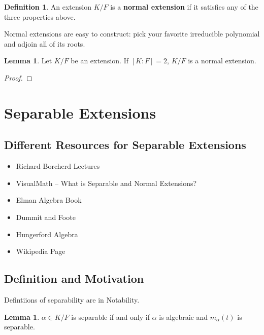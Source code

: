 \documentclass{article}
\theoremstyle{definition}
\newtheorem{definition}{Definition}
\newtheorem{lemma}[theorem]{Lemma}
\begin{document}
\begin{definition}
    An extension $K/F$ is a \textbf{normal extension} if it satisfies any of the three
    properties above.
\end{definition}

Normal extensions are easy to construct: pick your favorite irreducible
polynomial and adjoin all of its roots.

\begin{lemma}
    Let $K/F$ be an extension. If $[K:F] = 2$, $K/F$ is a normal extension.
\end{lemma}
\begin{proof}
    
\end{proof}



\newpage

\section{Separable Extensions}

\subsection{Different Resources for Separable Extensions}

\begin{itemize}
    \item Richard Borcherd Lectures
    \item VisualMath -- What is Separable and Normal Extensions?
    \item Elman Algebra Book
    \item Dummit and Foote
    \item Hungerford Algebra
    \item Wikipedia Page
\end{itemize}


\subsection{Definition and Motivation}

Defintiions of separability are in Notability.

\begin{lemma}\label{separable_iff_algebraic_and_min_poly_is_separable}
    $\alpha \in K/F$ is separable if and only if $\alpha$ is algebraic and $m_{\alpha}(t)$ is separable.
\end{lemma}
\end{document}

